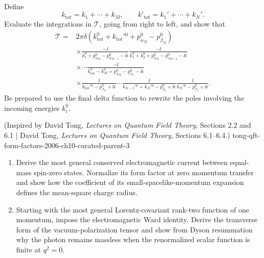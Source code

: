 \begin{enumerate}
\[\begin{split}
\end{split}
\tag{9.51}
\]
Define
\[
 k_{\mathrm{tot}}=k_1+\cdots+k_M,
 \qquad
 k'_{\mathrm{tot}}=k_1'+\cdots+k_N'.
\tag{9.53}
\]
Evaluate the integrations in \(\mathcal T\), going from right to left, and
show that
\[
\begin{split}
\mathcal T={}&2\pi\delta\!\left(
 k_{\mathrm{tot}}^0+k_{\mathrm{tot}}'{}^0
 +p_{\alpha_M}^0-p_{\beta_N}^0\right)
\\
&\times
 \frac{-\ii}{k_1^0+p_{\alpha_M}^0-p_{\alpha_{M-1}}^0-\ii\epsilon}
 \frac{-\ii}{k_1^0+k_2^0+p_{\alpha_M}^0-p_{\alpha_{M-2}}^0-\ii\epsilon}
\\[-2pt]
&\times\cdots
 \frac{-\ii}{k_{\mathrm{tot}}^0-k_M^0+p_{\alpha_M}^0-p_{\alpha_1}^0-\ii\epsilon}
\\
&\times
 \frac{\ii}{k_{\mathrm{tot}}'{}^0-p_{\beta_N}^0+\ii\epsilon}
 \cdots
 \frac{\ii}{k_{N-1}'{}^0+k_N'{}^0-p_{\beta_2}^0+\ii\epsilon}
 \frac{\ii}{k_N'{}^0-p_{\beta_1}^0+\ii\epsilon}.
\end{split}
\tag{9.52}
\]
Be prepared to use the final delta function to rewrite the poles involving
the incoming energies \(k_i^0\).

  {(Inspired by David Tong, \emph{Lectures on Quantum Field Theory}, Sections 2.2 and 6.1 | David Tong, \emph{Lectures on Quantum Field Theory}, Sections 6.1--6.4.)}
  {tong-qft-form-factors-2006-ch10-curated-parent-3}
\begin{enumerate}
\item
Derive the most general conserved electromagnetic current between equal-mass
spin-zero states.  Normalize its form factor at zero momentum transfer and
show how the coefficient of its small-spacelike-momentum expansion defines
the mean-square charge radius.
\item
Starting with the most general Lorentz-covariant rank-two function of one
momentum, impose the electromagnetic Ward identity.  Derive the transverse
form of the vacuum-polarization tensor and show from Dyson resummation why
the photon remains massless when the renormalized scalar function is finite
at \(q^2=0\).
\end{enumerate}


\end{enumerate}
